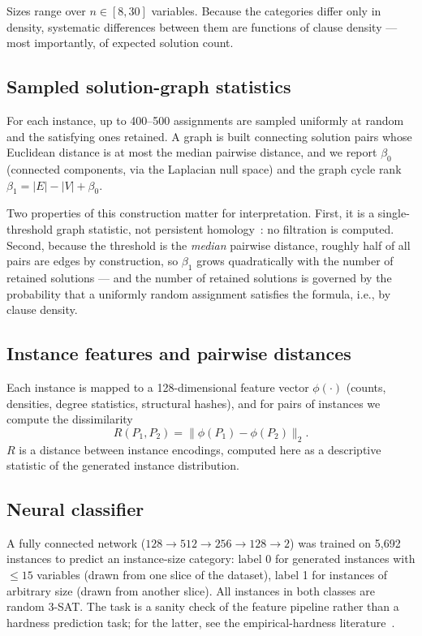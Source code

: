 \documentclass[11pt]{article}
\newcommand{\SAT}{\textsf{SAT}}
\begin{document}
Sizes range over $n \in [8, 30]$ variables. Because the categories differ only in density, systematic differences between them are functions of clause density --- most importantly, of expected solution count.

\subsection{Sampled solution-graph statistics}
\label{sec:topo-method}

For each instance, up to 400--500 assignments are sampled uniformly at random and the satisfying ones retained. A graph is built connecting solution pairs whose Euclidean distance is at most the median pairwise distance, and we report $\beta_0$ (connected components, via the Laplacian null space) and the graph cycle rank $\beta_1 = |E| - |V| + \beta_0$.

Two properties of this construction matter for interpretation. First, it is a single-threshold graph statistic, not persistent homology~\cite{EdelsbrunnerHarer2010}: no filtration is computed. Second, because the threshold is the \emph{median} pairwise distance, roughly half of all pairs are edges by construction, so $\beta_1$ grows quadratically with the number of retained solutions --- and the number of retained solutions is governed by the probability that a uniformly random assignment satisfies the formula, i.e., by clause density.

\subsection{Instance features and pairwise distances}
\label{sec:feat-method}

Each instance is mapped to a 128-dimensional feature vector $\phi(\cdot)$ (counts, densities, degree statistics, structural hashes), and for pairs of instances we compute the dissimilarity
\[
R(P_1, P_2) = \|\phi(P_1) - \phi(P_2)\|_2 .
\]
$R$ is a distance between instance encodings, computed here as a descriptive statistic of the generated instance distribution.

\subsection{Neural classifier}
\label{sec:nn-method}

A fully connected network ($128 \to 512 \to 256 \to 128 \to 2$) was trained on 5{,}692 instances to predict an instance-size category: label 0 for generated instances with $\leq 15$ variables (drawn from one slice of the dataset), label 1 for instances of arbitrary size (drawn from another slice). All instances in both classes are random 3-\SAT{}. The task is a sanity check of the feature pipeline rather than a hardness prediction task; for the latter, see the empirical-hardness literature~\cite{SATzilla}.
\end{document}
